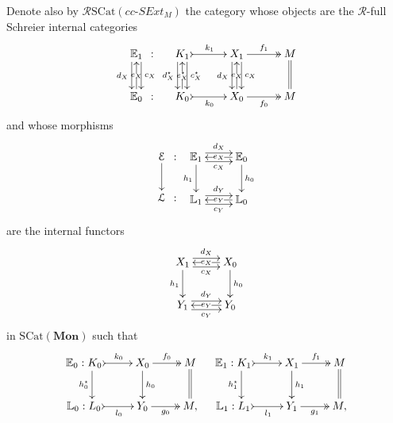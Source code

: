 \documentclass[a4paper]{amsart}
\theoremstyle{plain}
\theoremstyle{definition}
\theoremstyle{remark}
\begin{document}
Denote also by $\mathcal{R}\mathrm{SCat}(cc\text{-}SExt_M)$ the category whose objects are the $\mathcal{R}$-full Schreier internal categories
\begin{equation*}
\begin{aligned}
{
\xymatrixcolsep{0.1pc}
\xymatrix{
{{\mathbb{E}}_1}  \ar@<-.99ex>[d]_{d_X} \ar@<.99ex>[d]^{c_X} &{:}\\
{{\mathbb{E}}_0} \ar[u]|{e_X} &{:}
}
}
{\xymatrixcolsep{2.5pc}\xymatrix{
{K_1} \ar@<-.99ex>[d]_{d^\star_X} \ar@<.99ex>[d]^{c^\star_X} \ar@{>->}[r]^-{k_1} &{X_1} \ar@<-.99ex>[d]_{d_X} \ar@<.99ex>[d]^{c_X} \ar@{->>}[r]^-{f_1} &{M} \ar@{=}[d] \\
{K_0} \ar[u]|{e^\star_X} \ar@{>->}[r]_-{k_0} &{X_0} \ar[u]|{e_X} \ar@{->>}[r]_-{f_0} &{M}
}}
\end{aligned}
\end{equation*}
and whose morphisms
\begin{equation}
\label{eqn:morphism_of_R-full}
\begin{aligned}
{\xymatrixcolsep{0.1pc}
\xymatrix{
{\mathcal{E}} \ar[d] &{:}\\
{\mathcal{L}} &{:}
}
}
{\xymatrix{
{{\mathbb{E}}_1} \ar[d]_-{h_1} \ar@<.9ex>[r]^-{d_X} \ar@<-.9ex>[r]_-{c_X} &{{\mathbb{E}}_0} \ar[d]^-{h_0} \ar[l]|{e_X} \\
{{\mathbb{L}}_1} \ar@<.9ex>[r]^-{d_Y} \ar@<-.9ex>[r]_-{c_Y} &{{\mathbb{L}}_0} \ar[l]|{e_Y}
}}
\end{aligned}
\end{equation}
are the internal functors
\begin{equation*}
\xymatrix{
{X_1} \ar[d]_-{h_1} \ar@<.9ex>[r]^-{d_X} \ar@<-.9ex>[r]_-{c_X} &{X_0} \ar[d]^-{h_0} \ar[l]|{e_X} \\
{Y_1} \ar@<.9ex>[r]^-{d_Y} \ar@<-.9ex>[r]_-{c_Y} &{Y_0} \ar[l]|{e_Y}
}
\end{equation*}
in $\mathrm{SCat}(\mathbf{Mon})$ such that
\begin{equation*}
\begin{aligned}
{\xymatrix{
{{\mathbb{E}}_0:K_0} \ar@<1.7ex>[d]_-{h^\star_0} \ar@{>->}[r]^-{k_0} &{X_0} \ar[d]^-{h_0} \ar@{->>}[r]^-{f_0} &M \ar@{=}[d]\\
{{\mathbb{L}}_0:L_0} \ar@{>->}[r]_-{l_0} &{Y_0} \ar@{->>}[r]_-{g_0} &{M,}
}}
\
\
\
{\xymatrix{
{{\mathbb{E}}_1:K_1} \ar@<1.7ex>[d]_-{h^\star_1} \ar@{>->}[r]^-{k_1} &{X_1} \ar[d]^-{h_1} \ar@{->>}[r]^-{f_1} &M \ar@{=}[d]\\
{{\mathbb{L}}_1:L_1} \ar@{>->}[r]_-{l_1} &{Y_1} \ar@{->>}[r]_-{g_1} &{M,}
}}
\end{aligned}
\end{equation*}
\end{document}
